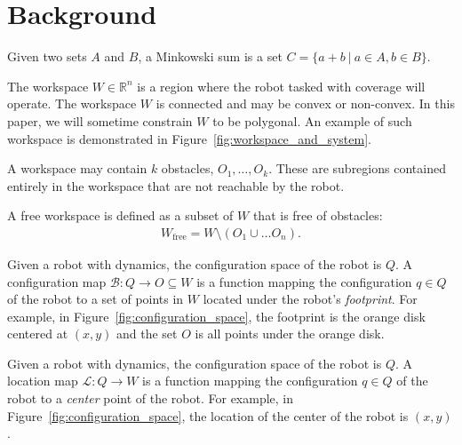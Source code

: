 \documentclass[../main.tex]{subfiles}
\begin{document}
\chapter{Background}
\label{chapter:background}


\begin{definition}
Given two sets $A$ and $B$, a Minkowski sum is a set $C=\{a+b\ |\ a\in A, b\in B\}$.
\end{definition}

\begin{definition}[Workspace]
The workspace $W\in\mathbb{R}^n$ is a region where the robot tasked with coverage will operate. The workspace $W$ is connected and may be convex or non-convex. In this paper, we will sometime constrain $W$ to be polygonal. An example of such workspace is demonstrated in Figure~\ref{fig:workspace_and_system}.
\end{definition}

\begin{definition}[Obstacles]
A workspace may contain $k$ obstacles, $O_1,\ldots,O_k$. These are subregions contained entirely in the workspace that are not reachable by the robot. 
\end{definition}

\begin{definition}
A free workspace is defined as a subset of $W$ that is free of obstacles:
	\begin{equation}
	\begin{aligned}
		W_{\text{free}}=W\setminus(O_1\cup\dots O_n).
	\end{aligned}
	\end{equation}
\end{definition}

\begin{definition}
\label{definition:c_space_and_map}
Given a robot with dynamics, the configuration space of the robot is $Q$. A configuration map $\mathcal{B}:Q\to O\subseteq W$ is a function mapping the configuration $q\in Q$ of the robot to a set of points in $W$ located under the robot's \emph{footprint}. For example, in Figure~\ref{fig:configuration_space}, the footprint is the orange disk centered at $(x,y)$ and the set $O$ is all points under the orange disk.
\end{definition}

\begin{definition}
\label{definition:location_map}
Given a robot with dynamics, the configuration space of the robot is $Q$. A location map $\mathcal{L}:Q\to W$ is a function mapping the configuration $q\in Q$ of the robot to a \emph{center} point of the robot. For example, in Figure~\ref{fig:configuration_space}, the location of the center of the robot is $(x,y)$.
\end{definition}
\end{document}
